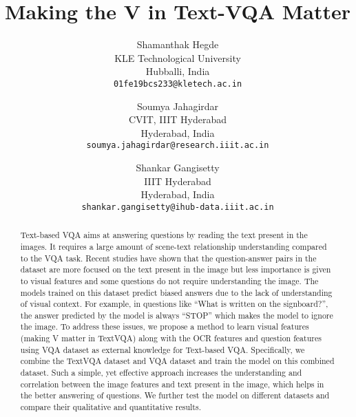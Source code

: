 \documentclass[10pt,twocolumn,letterpaper]{article}
\begin{document}
\title{Making the V in Text-VQA Matter}

\author{Shamanthak Hegde\\
KLE Technological University\\
Hubballi, India\\
{\tt\small 01fe19bcs233@kletech.ac.in}
\and
Soumya Jahagirdar\\
CVIT, IIIT Hyderabad\\
Hyderabad, India\\
{\tt\small soumya.jahagirdar@research.iiit.ac.in}
\and
Shankar Gangisetty\\
IIIT Hyderabad\\
Hyderabad, India\\
{\tt\small shankar.gangisetty@ihub-data.iiit.ac.in}
}
\maketitle

\begin{abstract}
    Text-based VQA aims at answering questions by reading the text present in the images. It requires a large amount of scene-text relationship understanding compared to the VQA task. Recent studies have shown that the question-answer pairs in the dataset are more focused on the text present in the image but less importance is given to visual features and some questions do not require understanding the image. The models trained on this dataset predict biased answers due to the lack of understanding of visual context. For example, in questions like “What is written on the signboard?”, the answer predicted by the model is always “STOP” which makes the model to ignore the image. To address these issues, we propose a method to learn visual features (making V matter in TextVQA) along with the OCR features and question features using VQA dataset as external knowledge for Text-based VQA. Specifically, we combine the TextVQA dataset and VQA dataset and train the model on this combined dataset. Such a simple, yet effective approach increases the understanding and correlation between the image features and text present in the image, which helps in the better answering of questions. We further test the model on different datasets and compare their qualitative and quantitative results.
\end{abstract}
\end{document}
